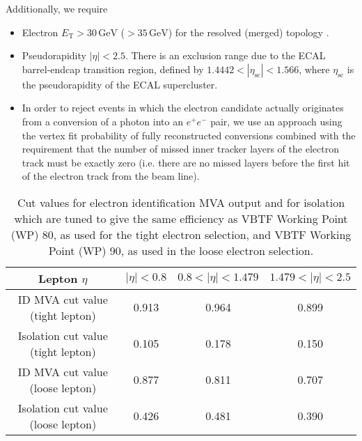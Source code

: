 Additionally, we require
\begin{itemize}
\item Electron $E_\mathrm{T} > 30\,\mathrm{GeV}$ ($> 35\,\mathrm{GeV}$) for the resolved (merged) topology .
\item Pseudorapidity $|\eta| < 2.5$. There is an exclusion range due
        to the ECAL barrel-endcap transition region, defined by
        $1.4442 < |\eta_{\mathrm{sc}}| < 1.566$, where
        $\eta_{\mathrm{sc}}$ is the pseudorapidity of the ECAL
        supercluster.


\item
In order to reject events in which the electron candidate actually
originates from a conversion of a photon into an $e^{+}e^{-}$ pair, we
use an approach using the vertex fit probability of fully
reconstructed conversions combined with the requirement that the
number of missed inner tracker layers of the electron track must be
exactly zero (i.e. there are no missed layers before the first hit of
the electron track from the beam line).
\end{itemize}

\begin{table}[bthp]
\begin{center}
{\footnotesize
\begin{tabular}{|c|c|c|c|}
\hline
Lepton $\eta$ & $|\eta| < 0.8$ & $0.8 < |\eta| < 1.479$ & $1.479 < |\eta| < 2.5$  \\
\hline
ID MVA cut value (tight lepton) & 0.913 & 0.964 & 0.899 \\
Isolation cut value (tight lepton) & 0.105 & 0.178 & 0.150 \\
ID MVA cut value (loose lepton) & 0.877 & 0.811 & 0.707 \\
Isolation cut value (loose lepton) & 0.426 & 0.481 & 0.390 \\
\hline
\end{tabular}
\caption[.]{\label{tab:EleID} Cut values for electron identification
MVA output and for isolation which are tuned to give the same
efficiency as VBTF Working Point (WP) 80, as used for the tight
electron selection, and VBTF Working Point (WP) 90, as used in the
loose electron selection.}}
\end{center}
\end{table}


